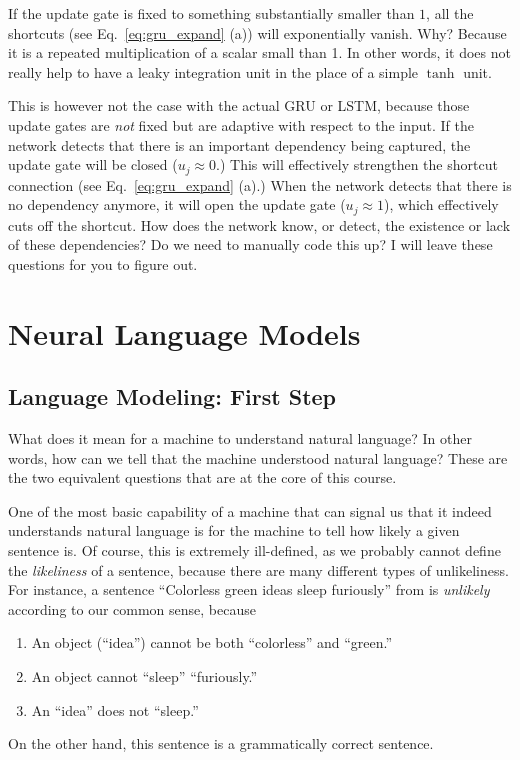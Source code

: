 \documentclass{report}
\newcommand{\alert}[1]{\textcolor{red}{#1}}
\begin{document}
If the update gate is fixed to something substantially smaller than $1$, all the
shortcuts (see Eq.~\eqref{eq:gru_expand} (a)) will exponentially vanish. Why?
Because it is a repeated multiplication of a scalar small than 1. In other
words, it does not really help to have a leaky integration unit in the place of
a simple $\tanh$ unit.

This is however not the case with the actual GRU or LSTM, because those update
gates are {\em not} fixed but are adaptive with respect to the input. If the
network detects that there is an important dependency being captured, the update
gate will be closed ($u_j \approx 0$.) This will effectively strengthen the
shortcut connection (see Eq.~\eqref{eq:gru_expand} (a).) When the network
detects that there is no dependency anymore, it will open the update gate ($u_j
\approx 1$), which effectively cuts off the shortcut. How does the network know,
or detect, the existence or lack of these dependencies? Do we need to manually
code this up? I will leave these questions for you to figure out.


%


\chapter{Neural Language Models}
\label{chap:nlm}

\section{Language Modeling: First Step}

What does it mean for a machine to understand natural language? In other words,
how can we tell that the machine understood natural language?  These are the two
equivalent questions that are at the core of this course. 

One of the most basic capability of a machine that can signal us that it indeed
understands natural language is for the machine to tell how likely a given
sentence is. Of course, this is extremely ill-defined, as we probably cannot
define the {\em likeliness} of a sentence, because there are many different
types of unlikeliness. For instance, a sentence ``Colorless green ideas sleep
furiously'' from \citet{chomsky2002syntactic} is {\em unlikely}
according to our common sense, because 
\begin{enumerate}
    \itemsep 0em
    \item An object (``idea'') cannot be both ``colorless'' and ``green.''
    \item An object cannot ``sleep'' ``furiously.''
    \item An ``idea'' does not ``sleep.''
\end{enumerate}
On the other hand, this sentence is a grammatically correct sentence.
\end{document}
